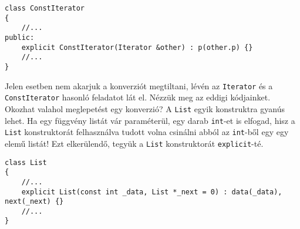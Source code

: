 \documentclass[a4paper,11.5pt,table]{article}
\begin{document}
\begin{lstlisting}
class ConstIterator
{
	//...
public:
	explicit ConstIterator(Iterator &other) : p(other.p) {}
	//...
}
\end{lstlisting}
	Jelen esetben nem akarjuk a konverziót megtiltani, lévén az \texttt{Iterator} és a \texttt{ConstIterator} hasonló feladatot lát el. Nézzük meg az eddigi kódjainket. Okozhat valahol meglepetést egy konverzió? A \texttt{List} egyik konstruktra gyanús lehet. Ha egy függvény listát vár paraméterül, egy darab \texttt{int}-et is elfogad, hisz a \texttt{List} konstruktorát felhasználva tudott volna csinálni abból az \texttt{int}-ből egy egy elemű listát! Ezt elkerülendő, tegyük a \texttt{List} konstruktorát \texttt{explicit}-té.
	\begin{lstlisting}
class List
{
	//...
	explicit List(const int _data, List *_next = 0) : data(_data), next(_next) {}
	//...
}
	\end{lstlisting}
\end{document}
